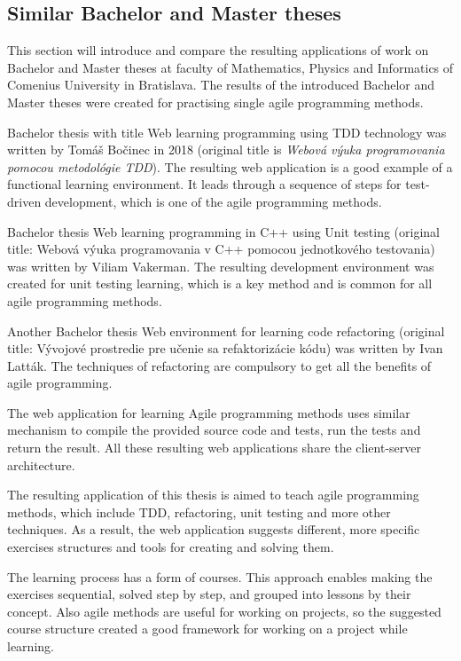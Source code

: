 \subsection{Similar Bachelor and Master theses}
This section will introduce and compare the resulting applications of work on Bachelor and Master theses at faculty of Mathematics, Physics and Informatics of Comenius University in Bratislava. The results of the introduced Bachelor and Master theses were created for practising single agile programming methods.

Bachelor thesis with title Web learning programming using TDD technology was written by Tomáš Bočinec in 2018 (original title is \textit{Webová výuka programovania pomocou metodológie TDD}). The resulting web application is a good example of a functional learning environment. It leads through a sequence of steps for test-driven development, which is one of the agile programming methods.

Bachelor thesis Web learning programming in C++ using Unit testing (original title: Webová výuka programovania v C++ pomocou jednotkového testovania) was written by Viliam Vakerman. The resulting development environment was created for unit testing learning, which is a key method and is common for all agile programming methods. 

Another Bachelor thesis Web environment for learning code refactoring (original title: Vývojové prostredie pre učenie sa refaktorizácie kódu) was written by Ivan Latták. The techniques of refactoring are compulsory to get all the benefits of agile programming.

The web application for learning Agile programming methods uses similar mechanism to compile the provided source code and tests, run the tests and return the result. All these resulting web applications share the client-server architecture.

The resulting application of this thesis is aimed to teach agile programming methods, which include TDD, refactoring, unit testing and more other techniques. As a result, the web application suggests different, more specific exercises structures and tools for creating and solving them. 

The learning process has a form of courses. This approach enables making the exercises sequential, solved step by step, and grouped into lessons by their concept. Also agile methods are useful for working on projects, so the suggested course structure created a good framework for working on a project while learning.

